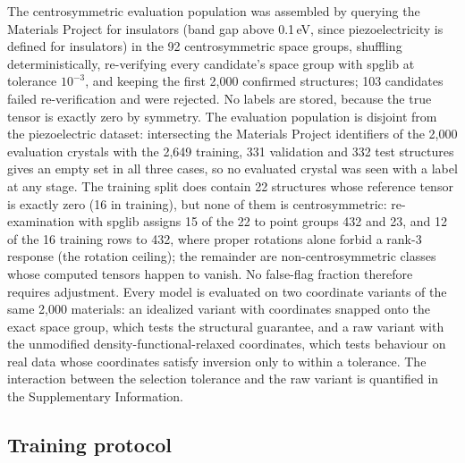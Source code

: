The centrosymmetric evaluation population was assembled by querying the Materials Project for insulators (band gap above 0.1\,eV, since piezoelectricity is defined for insulators) in the 92 centrosymmetric space groups, shuffling deterministically, re-verifying every candidate's space group with spglib at tolerance $10^{-3}$, and keeping the first 2,000 confirmed structures; 103 candidates failed re-verification and were rejected. No labels are stored, because the true tensor is exactly zero by symmetry. The evaluation population is disjoint from the piezoelectric dataset: intersecting the Materials Project identifiers of the 2,000 evaluation crystals with the 2,649 training, 331 validation and 332 test structures gives an empty set in all three cases, so no evaluated crystal was seen with a label at any stage. The training split does contain 22 structures whose reference tensor is exactly zero (16 in training), but none of them is centrosymmetric: re-examination with spglib assigns 15 of the 22 to point groups 432 and 23, and 12 of the 16 training rows to 432, where proper rotations alone forbid a rank-3 response (the rotation ceiling); the remainder are non-centrosymmetric classes whose computed tensors happen to vanish. No false-flag fraction therefore requires adjustment. Every model is evaluated on two coordinate variants of the same 2,000 materials: an idealized variant with coordinates snapped onto the exact space group, which tests the structural guarantee, and a raw variant with the unmodified density-functional-relaxed coordinates, which tests behaviour on real data whose coordinates satisfy inversion only to within a tolerance. The interaction between the selection tolerance and the raw variant is quantified in the Supplementary Information.

\subsection*{Training protocol}

